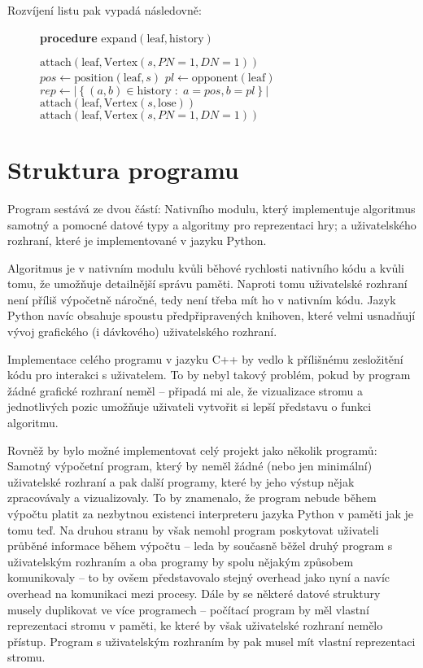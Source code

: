 \documentclass{article}
\begin{document}
Rozvíjení listu pak vypadá následovně:
\begin{figure}[H]
{\bf procedure} $\text{expand}(\text{leaf}, \text{history})$
\begin{algorithmic}
		\STATE $\text{attach}(\text{leaf}, \text{Vertex}(s, PN=1, DN=1))$
	\ELSE
		\STATE $pos \gets \text{position}(\text{leaf}, s)$
		\STATE $pl \gets \text{opponent}(\text{leaf})$
		\STATE $rep \gets \left|\left\{ (a, b) \in \text{history} \;:\; a = pos, b = pl \right\}\right|$
			\STATE $\text{attach}(\text{leaf}, \text{Vertex}(s, \text{lose}))$
		\ELSE
			\STATE $\text{attach}(\text{leaf}, \text{Vertex}(s, PN=1, DN=1))$
		\ENDIF
	\ENDIF
\ENDFOR
\end{algorithmic}
\end{figure}

\section{Struktura programu}
Program sestává ze dvou částí: Nativního modulu, který implementuje algoritmus samotný a pomocné datové typy a algoritmy
pro reprezentaci hry; a uživatelského rozhraní, které je implementované v jazyku Python.

Algoritmus je v nativním modulu kvůli běhové rychlosti nativního kódu a kvůli tomu, že umožňuje detailnější správu
paměti. Naproti tomu uživatelské rozhraní není příliš výpočetně náročné, tedy není třeba mít ho v nativním kódu. Jazyk
Python navíc obsahuje spoustu předpřipravených knihoven, které velmi usnadňují vývoj grafického (i dávkového)
uživatelského rozhraní.

Implementace celého programu v jazyku C++ by vedlo k přílišnému zesložitění kódu pro interakci s uživatelem. To by nebyl
takový problém, pokud by program žádné grafické rozhraní neměl -- připadá mi ale, že vizualizace stromu a jednotlivých
pozic umožňuje uživateli vytvořit si lepší představu o funkci algoritmu.

Rovněž by bylo možné implementovat celý projekt jako několik programů: Samotný výpočetní program, který by neměl žádné
(nebo jen minimální) uživatelské rozhraní a pak další programy, které by jeho výstup nějak zpracovávaly a vizualizovaly.
To by znamenalo, že program nebude během výpočtu platit za nezbytnou existenci interpreteru jazyka Python v paměti jak
je tomu teď. Na druhou stranu by však nemohl program poskytovat uživateli průběné informace během výpočtu -- leda by
současně běžel druhý program s uživatelským rozhraním a oba programy by spolu nějakým způsobem komunikovaly -- to by
ovšem představovalo stejný overhead jako nyní a navíc overhead na komunikaci mezi procesy. Dále by se některé datové
struktury musely duplikovat ve více programech -- počítací program by měl vlastní reprezentaci stromu v paměti, ke které
by však uživatelské rozhraní nemělo přístup. Program s uživatelským rozhraním by pak musel mít vlastní reprezentaci
stromu.
\end{document}
